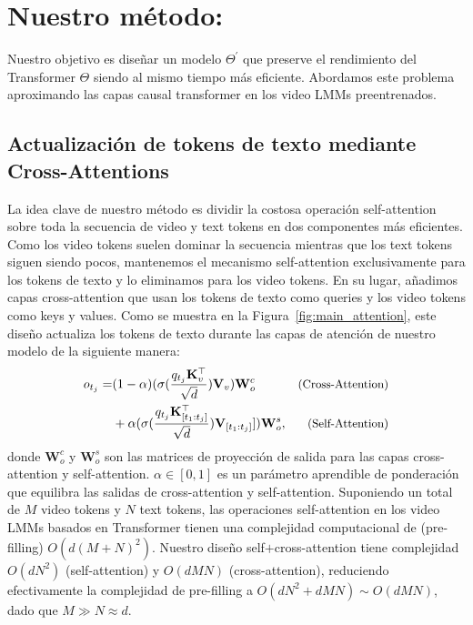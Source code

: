 \section{Nuestro método: \model}
Nuestro objetivo es diseñar un modelo $\Theta^\prime$ que preserve el rendimiento del Transformer $\Theta$ siendo al mismo tiempo más eficiente. Abordamos este problema aproximando las capas causal transformer en los video LMMs preentrenados.

\subsection{Actualización de tokens de texto mediante Cross-Attentions}
\label{sec:cross_attention}
La idea clave de nuestro método es dividir la costosa operación self-attention sobre toda la secuencia de video y text tokens en dos componentes más eficientes. Como los video tokens suelen dominar la secuencia mientras que los text tokens siguen siendo pocos, mantenemos el mecanismo self-attention exclusivamente para los tokens de texto y lo eliminamos para los video tokens. En su lugar, añadimos capas cross-attention que usan los tokens de texto como queries y los video tokens como keys y values. Como se muestra en la Figura~\ref{fig:main_attention}, este diseño actualiza los tokens de texto durante las capas de atención de nuestro modelo de la siguiente manera:
\vspace{-0.5em}
\begin{equation}
\label{equ:our_attention}
\begin{aligned}
    o_{t_j}= & (1-\alpha)(\sigma(\frac{q_{t_j} \mathbf{K}_v^\top}{\sqrt{d}})\mathbf{V}_v)\mathbf{W}^{c}_{o} & \text{\small(Cross-Attention)}\\ 
    & +\alpha(\sigma(\frac{q_{t_j} \mathbf{K}_{[t_1:t_j]}^\top}{\sqrt{d}})\mathbf{V}_{[t_1:t_j]}])\mathbf{W}^{s}_{o}, & \text{\small(Self-Attention)}
\end{aligned}
\end{equation}
donde $\mathbf{W}_o^c$ y $\mathbf{W}_o^s$ son las matrices de proyección de salida para las capas cross-attention y self-attention. $\alpha\in [0, 1]$ es un parámetro aprendible de ponderación que equilibra las salidas de cross-attention y self-attention. Suponiendo un total de $M$ video tokens y $N$ text tokens, las operaciones self-attention en los video LMMs basados en Transformer tienen una complejidad computacional de (pre-filling) $O(d(M+N)^2)$. Nuestro diseño self$+$cross-attention tiene complejidad $O(dN^2)$ (self-attention) y $O(dMN)$ (cross-attention), reduciendo efectivamente la complejidad de pre-filling a $O(dN^2+dMN)\sim O(dMN)$, dado que $M\gg N \approx d$.

